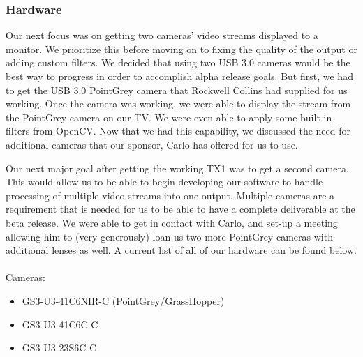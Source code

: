 \documentclass[letterpaper,10pt,titlepage]{IEEEtran}
\begin{document}
   \subsubsection{Hardware}
   Our next focus was on getting two cameras' video streams displayed to a monitor. We prioritize this before moving on to fixing the quality of the output or adding custom filters. We decided that using two USB 3.0 cameras would be the best way to progress in order to accomplish alpha release goals. But first, we had to get the USB 3.0 PointGrey camera that Rockwell Collins had supplied for us working. Once the camera was working, we were able to display the stream from the PointGrey camera on our TV. We were even able to apply some built-in filters from OpenCV. Now that we had this capability, we discussed the need for additional cameras that our sponsor, Carlo has offered for us to use.\\
   \par
Our next major goal after getting the working TX1 was to get a second camera. This would allow us to be able to begin developing our software to handle processing of multiple video streams into one output. Multiple cameras are a requirement that is needed for us to be able to have a complete deliverable at the beta release. We were able to get in contact with Carlo, and set-up a meeting allowing him to (very generously) loan us two more PointGrey cameras with additional lenses as well. A current list of all of our hardware can be found below. \\
  	\\Cameras:  
    		\begin{itemize}
		\item GS3-U3-41C6NIR-C (PointGrey/GrassHopper)
		\item GS3-U3-41C6C-C
		\item GS3-U3-23S6C-C\\

		\end{itemize}
\end{document}
